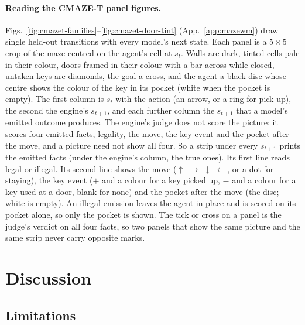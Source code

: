 \documentclass{article} %
\begin{document}
\paragraph{Reading the CMAZE-T panel figures.} Figs.~\ref{fig:cmazet-families}--\ref{fig:cmazet-door-tint}
(App.~\ref{app:mazewm}) draw single held-out transitions with every model's next state. Each panel
is a $5\times5$ crop of the maze centred on the agent's cell at $s_t$. Walls are dark, tinted cells
pale in their colour, doors framed in their colour with a bar across while closed, untaken keys are
diamonds, the goal a cross, and the agent a black disc whose centre shows the colour of the key in its
pocket (white when the pocket is empty). The first column is $s_t$ with the action (an arrow, or a
ring for pick-up), the second the engine's $s_{t+1}$, and each further column the $s_{t+1}$ that a
model's emitted outcome produces. The engine's judge does not score the picture: it scores four
emitted facts, legality, the move, the key event and the pocket after the move, and a picture need
not show all four. So a strip under every $s_{t+1}$ prints the emitted facts (under the engine's
column, the true ones). Its first line reads legal or illegal. Its second line shows the move
($\uparrow$ $\rightarrow$ $\downarrow$ $\leftarrow$, or a dot for staying), the key event ($+$ and a
colour for a key picked up, $-$ and a colour for a key used at a door, blank for none) and the pocket
after the move (the disc; white is empty). An illegal emission leaves the agent in place and is scored
on its pocket alone, so only the pocket is shown. The tick or cross on a panel is the judge's verdict
on all four facts, so two panels that show the same picture and the same strip never carry opposite
marks.

\section{Discussion}
\label{sec:limits}

\subsection{Limitations}
\label{sec:limits-list}
\end{document}

